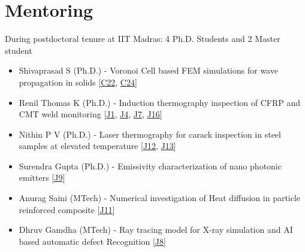 \documentclass{my_cv}%
\begin{document}
\section{Mentoring}
\vspace{1em}
\noindent \faEye \hspace{1em} \color{mygray} During postdoctoral tenure at IIT Madras: 4 Ph.D. Students and 2 Master student 
\begin{itemize}[leftmargin=0.15in]
\setlength\itemsep{-0.1em}
\color{mygray}
\item Shivaprasad S (Ph.D.) - Voronoi Cell based FEM simulations for wave propagation in solids [\textcolor{mypink}{\hyperref[C22]{C22}}, \textcolor{mypink}{\hyperref[C24]{C24}}]
\item Renil Thomas K (Ph.D.) - Induction thermography inspection of CFRP and CMT weld monitoring [\textcolor{mypink}{\hyperref[J1]{J1}}, \textcolor{mypink}{\hyperref[J4]{J4}}, \textcolor{mypink}{\hyperref[J7]{J7}}, \textcolor{mypink}{\hyperref[J16]{J16}}] 
\item Nithin P V (Ph.D.) - Laser thermography for carack inspection in steel samples at elevated temperature [\textcolor{mypink}{\hyperref[J12]{J12}}, \textcolor{mypink}{\hyperref[J13]{J13}}]
\item Surendra Gupta (Ph.D.) - Emissivity characterization of nano photonic emitters [\textcolor{mypink}{\hyperref[J9]{J9}}]
\item Anurag Saini (MTech) - Numerical investigation of Heat diffusion in particle reinforced composite [\textcolor{mypink}{\hyperref[J11]{J11}}]
\item Dhruv Gamdha (MTech) - Ray tracing model for X-ray simulation and AI based automatic defect Recognition [\textcolor{mypink}{\hyperref[J8]{J8}}]
\end{itemize}
\end{document}
